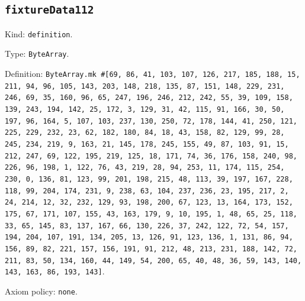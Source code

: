 \documentclass[11pt]{article}
\begin{document}
\subsection*{\texttt{fixtureData112}}
\noindent Kind: \texttt{definition}.\par
\noindent Type: \texttt{ByteArray}.\par
\noindent Definition: \texttt{ByteArray.mk \#[69, 86, 41, 103, 107, 126, 217, 185, 188, 15, 211, 94, 96, 105, 143, 203, 148, 218, 135, 87, 151, 148, 229, 231, 246, 69, 35, 160, 96, 65, 247, 196, 246, 212, 242, 55, 39, 109, 158, 139, 243, 194, 142, 25, 172, 3, 129, 31, 42, 115, 91, 166, 30, 50, 197, 96, 164, 5, 107, 103, 237, 130, 250, 72, 178, 144, 41, 250, 121, 225, 229, 232, 23, 62, 182, 180, 84, 18, 43, 158, 82, 129, 99, 28, 245, 234, 219, 9, 163, 21, 145, 178, 245, 155, 49, 87, 103, 91, 15, 212, 247, 69, 122, 195, 219, 125, 18, 171, 74, 36, 176, 158, 240, 98, 226, 96, 198, 1, 122, 76, 43, 219, 28, 94, 253, 11, 174, 115, 254, 230, 0, 136, 81, 123, 99, 201, 198, 215, 48, 113, 39, 197, 167, 228, 118, 99, 204, 174, 231, 9, 238, 63, 104, 237, 236, 23, 195, 217, 2, 24, 214, 12, 32, 232, 129, 93, 198, 200, 67, 123, 13, 164, 173, 152, 175, 67, 171, 107, 155, 43, 163, 179, 9, 10, 195, 1, 48, 65, 25, 118, 33, 65, 145, 83, 137, 167, 66, 130, 226, 37, 242, 122, 72, 54, 157, 194, 204, 107, 191, 134, 205, 13, 126, 91, 123, 136, 1, 131, 86, 94, 156, 89, 82, 221, 157, 156, 191, 91, 212, 48, 213, 231, 188, 142, 72, 211, 83, 50, 134, 160, 44, 149, 54, 200, 65, 40, 48, 36, 59, 143, 140, 143, 163, 86, 193, 143]}.\par
\noindent Axiom policy: \texttt{none}.\par
\end{document}
